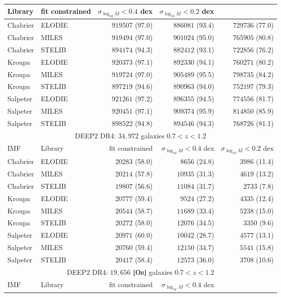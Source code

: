 \documentclass[onecolumn]{aa}
\newcommand{\OII}{$\left[\mathrm{O\textrm{\textsc{ii}}}\right]$\xspace}
\begin{document}
\begin{table*}
\begin{center}
\begin{tabular}{ll rrr}
Library & 
fit constrained & 
$\sigma_{\log_{10}M}<0.4$ dex & 
$\sigma_{\log_{10}M}<0.2$ dex \\ \hline
Chabrier & ELODIE & $919507$ (97.0) & $886081$ (93.4) & $729736$ (77.0) \\ 
Chabrier & MILES & $919494$ (97.0) & $901024$ (95.0) & $765905$ (80.8) \\ 
Chabrier & STELIB & $894174$ (94.3) & $882412$ (93.1) & $722856$ (76.2) \\ 
Kroupa & ELODIE & $920373$ (97.1) & $892330$ (94.1) & $760271$ (80.2) \\ 
Kroupa & MILES & $919724$ (97.0) & $905489$ (95.5) & $798735$ (84.2) \\ 
Kroupa & STELIB & $897219$ (94.6) & $890963$ (94.0) & $752197$ (79.3) \\ 
Salpeter & ELODIE & $921261$ (97.2) & $896355$ (94.5) & $774556$ (81.7) \\ 
Salpeter & MILES & $920451$ (97.1) & $909374$ (95.9) & $814850$ (85.9) \\ 
Salpeter & STELIB & $898522$ (94.8) & $894546$ (94.3) & $768726$ (81.1) \\ 
\hline 
\multicolumn{5}{c}{DEEP2 DR4: $34,972$ galaxies $0.7<z<1.2$} \\
IMF &
Library & 
fit constrained & 
$\sigma_{\log_{10}M}<0.4$ dex & 
$\sigma_{\log_{10}M}<0.2$ dex \\ \hline
Chabrier & ELODIE& $20283$ (58.0) & $8656$ (24.8) & $3986$ (11.4) \\ 
Chabrier & MILES& $20214$ (57.8) & $10935$ (31.3) & $4619$ (13.2) \\ 
Chabrier & STELIB& $19807$ (56.6) & $11084$ (31.7) & $2733$ (7.8) \\ 
Kroupa & ELODIE& $20777$ (59.4) & $9524$ (27.2) & $4335$ (12.4) \\ 
Kroupa & MILES& $20544$ (58.7) & $11689$ (33.4) & $5238$ (15.0) \\ 
Kroupa & STELIB& $20272$ (58.0) & $12076$ (34.5) & $3350$ (9.6) \\ 
Salpeter & ELODIE& $20971$ (60.0) & $10042$ (28.7) & $4577$ (13.1) \\ 
Salpeter & MILES& $20760$ (59.4) & $12150$ (34.7) & $5541$ (15.8) \\ 
Salpeter & STELIB& $20417$ (58.4) & $12573$ (36.0) & $3708$ (10.6) \\ 
\hline 
\multicolumn{5}{c}{DEEP2 DR4: $19,656$ \OII galaxies $0.7<z<1.2$} \\
IMF &
Library & 
fit constrained & 
$\sigma_{\log_{10}M}<0.4$ dex & 

\end{tabular}
\end{center}
\end{table*}
\end{document}
